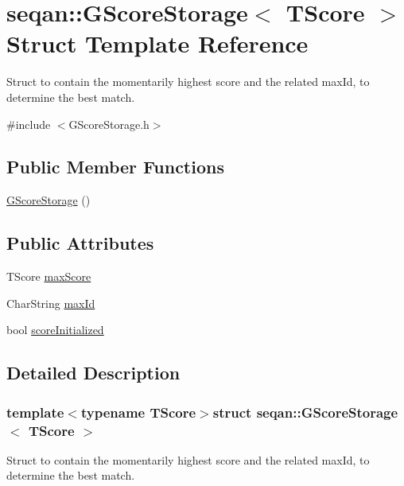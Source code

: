 \hypertarget{structseqan_1_1_g_score_storage}{\section{seqan\-:\-:G\-Score\-Storage$<$ T\-Score $>$ Struct Template Reference}
\label{structseqan_1_1_g_score_storage}
}


Struct to contain the momentarily highest score and the related max\-Id, to determine the best match.  




{\ttfamily \#include $<$G\-Score\-Storage.\-h$>$}

\subsection*{Public Member Functions}
\begin{DoxyCompactItemize}
\item 
\hyperlink{structseqan_1_1_g_score_storage_ae8c9ba7615d3cb36874aeab402138187}{G\-Score\-Storage} ()
\end{DoxyCompactItemize}
\subsection*{Public Attributes}
\begin{DoxyCompactItemize}
\item 
T\-Score \hyperlink{structseqan_1_1_g_score_storage_a6473cc22038cb7f21df5866a6c452883}{max\-Score}
\item 
Char\-String \hyperlink{structseqan_1_1_g_score_storage_a264d4bc37f5c32b79a8fbbb5ffd24a4f}{max\-Id}
\item 
bool \hyperlink{structseqan_1_1_g_score_storage_a57225443721c66d5a3e5290775dd350c}{score\-Initialized}
\end{DoxyCompactItemize}


\subsection{Detailed Description}
\subsubsection*{template$<$typename T\-Score$>$struct seqan\-::\-G\-Score\-Storage$<$ T\-Score $>$}

Struct to contain the momentarily highest score and the related max\-Id, to determine the best match. 

